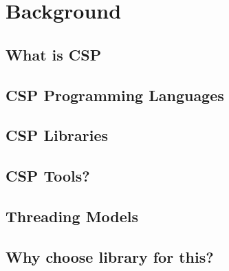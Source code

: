 
\chapter{Background}

\section{What is CSP}
\section{CSP Programming Languages}
\section{CSP Libraries}
\section{CSP Tools?}
\section{Threading Models}
\section{Why choose library for this?}


